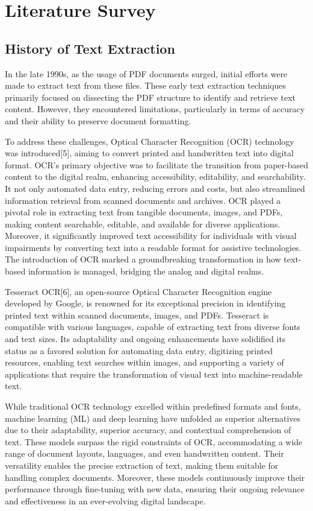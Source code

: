 \documentclass[conference]{IEEEtran}
\begin{document}
\section{Literature Survey}

\subsection{History of Text Extraction}

In the late 1990s, as the usage of PDF documents surged, initial efforts were made to extract text from these files. These early text extraction techniques primarily focused on dissecting the PDF structure to identify and retrieve text content. However, they encountered limitations, particularly in terms of accuracy and their ability to preserve document formatting. 

To address these challenges, Optical Character Recognition (OCR) technology was introduced[5], aiming to convert printed and handwritten text into digital format. OCR's primary objective was to facilitate the transition from paper-based content to the digital realm, enhancing accessibility, editability, and searchability. It not only automated data entry, reducing errors and costs, but also streamlined information retrieval from scanned documents and archives. OCR played a pivotal role in extracting text from tangible documents, images, and PDFs, making content searchable, editable, and available for diverse applications. Moreover, it significantly improved text accessibility for individuals with visual impairments by converting text into a readable format for assistive technologies. The introduction of OCR marked a groundbreaking transformation in how text-based information is managed, bridging the analog and digital realms.

Tesseract OCR[6], an open-source Optical Character Recognition engine developed by Google, is renowned for its exceptional precision in identifying printed text within scanned documents, images, and PDFs. Tesseract is compatible with various languages, capable of extracting text from diverse fonts and text sizes. Its adaptability and ongoing enhancements have solidified its status as a favored solution for automating data entry, digitizing printed resources, enabling text searches within images, and supporting a variety of applications that require the transformation of visual text into machine-readable text.

While traditional OCR technology excelled within predefined formats and fonts, machine learning (ML) and deep learning have unfolded as superior alternatives due to their adaptability, superior accuracy, and contextual comprehension of text. These models surpass the rigid constraints of OCR, accommodating a wide range of document layouts, languages, and even handwritten content. Their versatility enables the precise extraction of text, making them suitable for handling complex documents. Moreover, these models continuously improve their performance through fine-tuning with new data, ensuring their ongoing relevance and effectiveness in an ever-evolving digital landscape.
\end{document}

